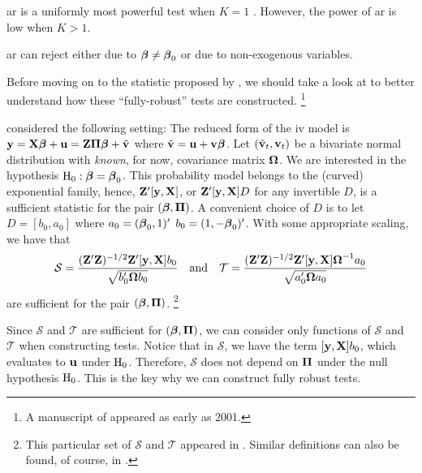 \documentclass[a4paper]{article}
\begin{document}
\begin{remark}
	\gls*{ar} is a uniformly most powerful test when $K=1$ \parencite{moreira-2009}.
	However, the power of \gls*{ar} is low when $K>1$.
\end{remark}

\begin{remark}
	\gls*{ar} can reject either due to $\boldsymbol{\beta}\neq\boldsymbol{\beta}_0$ or due to non-exogenous variables.
\end{remark}


Before moving on to the statistic proposed by \textcite{kleibergen-2002},
we should take a look at \textcite{moreira-2009} to better understand
how these ``fully-robust'' tests are constructed.%
\footnote{
	A manuscript of \textcite{moreira-2009} appeared as early as 2001.
}

\textcite{moreira-2009} considered the following setting:
The reduced form of the \gls*{iv} model is $\mathbf{y} = \mathbf{X}\boldsymbol{\beta} + \mathbf{u} = \mathbf{Z}\boldsymbol{\Pi}\boldsymbol{\beta} + \tilde{\mathbf{v}}$
where $\tilde{\mathbf{v}} = \mathbf{u} + \mathbf{v}\boldsymbol{\beta}$.
Let $(\tilde{\mathbf{v}}_t,\mathbf{v}_t)$ be a bivariate normal distribution with \emph{known}, for now, covariance matrix $\boldsymbol{\Omega}$.
We are interested in the hypothesis $\mathrm{H}_0:\boldsymbol{\beta}=\boldsymbol{\beta}_0$.
This probability model belongs to the (curved) exponential family,
hence, $\mathbf{Z}'[\mathbf{y},\mathbf{X}]$, or $\mathbf{Z}'[\mathbf{y},\mathbf{X}]D$ for any invertible $D$,
is a sufficient statistic for the pair $(\boldsymbol{\beta},\boldsymbol{\Pi})$.
A convenient choice of $D$ is to let $D=[b_0,a_0]$
where $a_0=(\boldsymbol{\beta}_0,1)'$ $b_0=(1,-\boldsymbol{\beta}_0)'$.
With some appropriate scaling, we have that
\begin{align}
	\mathcal{S} = \frac{ (\mathbf{Z}'\mathbf{Z})^{-1/2}\mathbf{Z}'[\mathbf{y},\mathbf{X}]b_0 }{ \sqrt{b_0'\boldsymbol{\Omega} b_0} } \quad\text{and}\quad
	\mathcal{T} = \frac{ (\mathbf{Z}'\mathbf{Z})^{-1/2}\mathbf{Z}'[\mathbf{y},\mathbf{X}]\boldsymbol{\Omega}^{-1} a_0 }{ \sqrt{a_0'\boldsymbol{\Omega} a_0} }
\end{align}
are sufficient for the pair $(\boldsymbol{\beta},\boldsymbol{\Pi})$.%
\footnote{
	This particular set of $\mathcal{S}$ and $\mathcal{T}$ appeared in \textcite{stock-wright-yogo-2002}.
	Similar definitions can also be found, of course, in \textcite{moreira-2009}.
}

\begin{remark}
	Since $\mathcal{S}$ and $\mathcal{T}$ are sufficient for $(\boldsymbol{\beta},\boldsymbol{\Pi})$,
	we can consider only functions of $\mathcal{S}$ and $\mathcal{T}$ when constructing tests.
	Notice that in $\mathcal{S}$, we have the term $[\mathbf{y},\mathbf{X}]b_0$, which evaluates to $\mathbf{u}$ under $\mathrm{H}_0$.
	Therefore, $\mathcal{S}$ does not depend on $\boldsymbol{\Pi}$ under the null hypothesis $\mathrm{H}_0$.
	This is the key why we can construct fully robust tests.
	\parencite{stock-wright-yogo-2002}
\end{remark}
\end{document}
